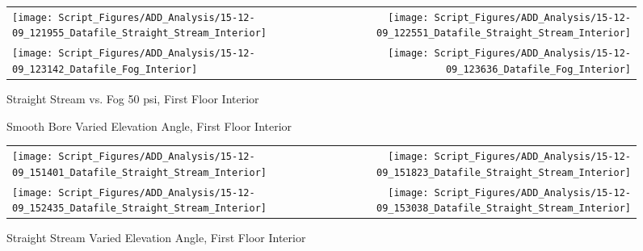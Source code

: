 \documentclass{article}
\begin{document}
\begin{appendices}
\begin{figure}[ht]
\begin{tabular*}{\textwidth}{lr}
\texttt{[image: Script\_Figures/ADD\_Analysis/15-12-09\_121955\_Datafile\_Straight\_Stream\_Interior]} &
\texttt{[image: Script\_Figures/ADD\_Analysis/15-12-09\_122551\_Datafile\_Straight\_Stream\_Interior]} \\
\texttt{[image: Script\_Figures/ADD\_Analysis/15-12-09\_123142\_Datafile\_Fog\_Interior]} &
\texttt{[image: Script\_Figures/ADD\_Analysis/15-12-09\_123636\_Datafile\_Fog\_Interior]} \\
\end{tabular*}
\caption{Straight Stream vs. Fog 50 psi, First Floor Interior}
\label{fig:Straight Stream vs. Fog 50 psi, First Floor Interior}
\end{figure}

\clearpage

\begin{figure}[ht]
\centering
{}
\caption{Smooth Bore Varied Elevation Angle, First Floor Interior}
\label{fig:Smooth Bore Varied Elevation Angle, First Floor Interior}
\end{figure}

\clearpage

\begin{figure}[ht]
\begin{tabular*}{\textwidth}{lr}
\texttt{[image: Script\_Figures/ADD\_Analysis/15-12-09\_151401\_Datafile\_Straight\_Stream\_Interior]} &
\texttt{[image: Script\_Figures/ADD\_Analysis/15-12-09\_151823\_Datafile\_Straight\_Stream\_Interior]} \\
\texttt{[image: Script\_Figures/ADD\_Analysis/15-12-09\_152435\_Datafile\_Straight\_Stream\_Interior]} &
\texttt{[image: Script\_Figures/ADD\_Analysis/15-12-09\_153038\_Datafile\_Straight\_Stream\_Interior]} \\
\end{tabular*}
\caption{Straight Stream Varied Elevation Angle, First Floor Interior}
\label{fig:Straight Stream Varied Elevation Angle, First Floor Interior}
\end{figure}

\clearpage

\end{appendices}
\end{document}
